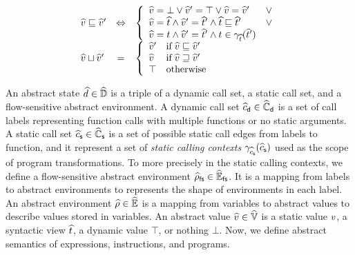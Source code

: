 \begin{itemize}
\[\begin{array}{lcl}
        \widehat{v} \sqsubseteq \widehat{v}' &\Leftrightarrow& \left\{
          \begin{array}{ll}
            \widehat{v} = \bot \vee \widehat{v}' = \top \vee \widehat{v} = \widehat{v}' & \vee\\
            \widehat{v} = \widehat{t} \wedge \widehat{v}' = \widehat{t}' \wedge
            \widehat{t} \sqsubseteq \widehat{t}' &\vee\\
            \widehat{v} = t \wedge \widehat{v}' = \widehat{t}' \wedge t \in
            \gamma_{\widehat{t}}(\widehat{t}')\\
          \end{array}
        \right.\\

        \widehat{v} \sqcup \widehat{v}' &=& \left\{
          \begin{array}{ll}
            \widehat{v}' & \text{if} \; \widehat{v} \sqsubseteq \widehat{v}'\\
            \widehat{v} & \text{if} \; \widehat{v} \sqsupseteq \widehat{v}'\\
            \top & \text{otherwise}\\
          \end{array}
        \right.\\
      \end{array}
    \]
\end{itemize}

An abstract state $\widehat{d} \in \widehat{\mathbb{D}}$ is a triple of a dynamic call set, a
static call set, and a flow-sensitive abstract environment.  A dynamic call set
$\widehat{c}_{\textsf{d}} \in \widehat{\mathbb{C}}_{\textsf{d}}$ is a set of call labels representing function calls
with multiple functions or no static arguments. A static call set $\widehat{c}_{\textsf{s}} \in
\widehat{\mathbb{C}}_{\textsf{s}}$ is a set of possible static call edges from labels to function, and
it represent a set of \textit{static calling contexts} $\gamma_{\widehat{c}_{\textsf{s}}}(\widehat{c}_{\textsf{s}})$
used as the scope of program transformations.  To more precisely in the static
calling contexts, we define a flow-sensitive abstract environment $\widehat{\rho}_{\textsf{fs}} \in
\widehat{\mathbb{E}}_{\textsf{fs}}$. It is a mapping from labels to abstract environments to represents
the shape of environments in each label. An abstract environment $\widehat{\rho} \in
\widehat{\mathbb{E}}$ is a mapping from variables to abstract values to describe values
stored in variables. An abstract value $\widehat{v} \in \widehat{\mathbb{V}}$ is a static value
$v$, a syntactic view $\widehat{t}$, a dynamic value $\top$, or nothing $\bot$.
Now, we define abstract semantics of expressions, instructions, and programs.

